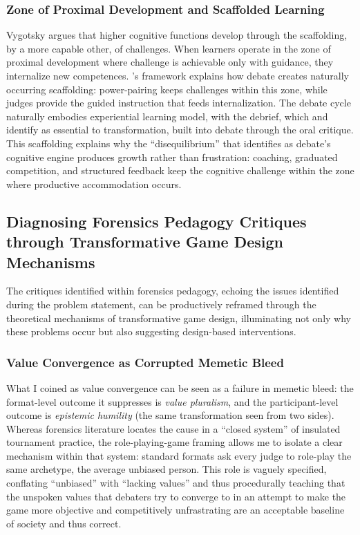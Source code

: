 \subsubsection{Zone of Proximal Development and Scaffolded Learning}

Vygotsky argues that higher cognitive functions develop through the scaffolding, by a more capable other, of challenges. When learners operate in the zone of proximal development where challenge is achievable only with guidance, they internalize new competences. \textcite{vygotsky1978mind}'s framework explains how debate creates naturally occurring scaffolding: power-pairing keeps challenges within this zone, while judges provide the guided instruction that feeds internalization. The debate cycle naturally embodies \textcite{kolb1984experiential} experiential learning model, with the debrief, which \textcite{crookall2014engaging} and \textcite{daniau2016transformative} identify as essential to transformation, built into debate through the oral critique. This scaffolding explains why the ``disequilibrium'' that \textcite{colbert1995enhancing} identifies as debate's cognitive engine produces growth rather than frustration: coaching, graduated competition, and structured feedback keep the cognitive challenge within the zone where productive accommodation occurs.

\subsection{Diagnosing Forensics Pedagogy Critiques through Transformative Game Design Mechanisms}

The critiques identified within forensics pedagogy, echoing the issues identified during the problem statement, can be productively reframed through the theoretical mechanisms of transformative game design, illuminating not only why these problems occur but also suggesting design-based interventions.

\subsubsection{Value Convergence as Corrupted Memetic Bleed}

What I coined as value convergence can be seen as a failure in memetic bleed: the format-level outcome it suppresses is \textit{value pluralism}, and the participant-level outcome is \textit{epistemic humility} (the same transformation seen from two sides). Whereas forensics literature locates the cause in a ``closed system'' of insulated tournament practice, the role-playing-game framing allows me to isolate a clear mechanism within that system: standard formats ask every judge to role-play the same archetype, the average unbiased person. This role is vaguely specified, conflating ``unbiased'' with ``lacking values'' and thus procedurally teaching that the unspoken values that debaters try to converge to in an attempt to make the game more objective and competitively unfrastrating are an acceptable baseline of society and thus correct.

